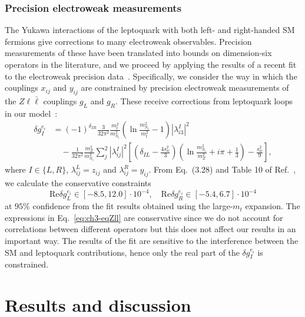 \subsubsection{Precision electroweak measurements}

The Yukawa interactions of the leptoquark with both left- and right-handed SM
fermions give corrections to many electroweak observables. Precision
measurements of these have been translated into bounds on dimension-six
operators in the literature, and we proceed by applying the results of a recent
fit to the electroweak precision data~\cite{Ciuchini:2013pca}. Specifically, we
consider the way in which the couplings $x_{ij}$ and $y_{ij}$ are constrained by
precision electroweak measurements of the $Z \ell \bar{\ell}$ couplings $g_L$
and $g_R$. These receive corrections from leptoquark loops in our
model~\cite{Bauer:2015knc}:
\begin{equation} \label{eq:ch3-neccond}
  \begin{split}
  \delta g_I^{e_i} &= (-1)^{\delta_{IR}} \frac{3}{32 \pi^2} \frac{m_t^2}{m_{S_{1}}^2} \left( \ln \frac{m_{S_{1}}^2}{m_t^2} - 1 \right) |\lambda^I_{i 3}|^2 \\ &\quad - \frac{1}{32 \pi^2}\frac{m_Z^2}{m_{S_{1}}^2}\sum_{j}^2 |\lambda^I_{i j}|^2 \left[ \left( \delta_{IL} - \frac{4 s_w^2}{3} \right) \left( \ln\frac{m_{S_{1}}^2}{m_Z^2} + i\pi + \frac{1}{3} \right) - \frac{s_w^2}{9}\right],
  \end{split}
\end{equation}
where $I \in \{L,R\}$, $\lambda^L_{ij} = z_{ij}$ and $\lambda^R_{ij} = y_{ij}$.
From Eq.~(3.28) and Table 10 of Ref.~\cite{Ciuchini:2013pca}, we calculate the
conservative constraints
\begin{equation} \label{eq:ch3-eqZll}
  \text{Re}\delta g_L^{e_i} \in [-8.5, 12.0] \cdot 10^{-4}, \quad \text{Re}\delta g_R^{e_i} \in [-5.4, 6.7] \cdot 10^{-4}
\end{equation}
at $95\%$ confidence from the fit results obtained using the large-$m_t$
expansion. The expressions in Eq.~\eqref{eq:ch3-eqZll} are conservative since we do
not account for correlations between different operators but this does not
affect our results in an important way. The results of the fit are sensitive to
the interference between the SM and leptoquark contributions, hence only the
real part of the $\delta g_I^{e_i}$ is constrained.

\section{Results and discussion}
\label{sec:ch3-resultsanddiscussion}

